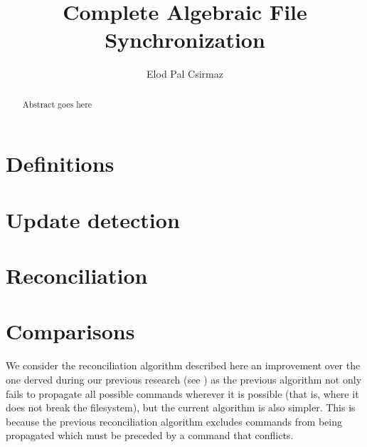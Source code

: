 \documentclass[12pt]{article}
\title{Complete Algebraic File Synchronization}
\author{Elod Pal Csirmaz}
\begin{document}
\maketitle
\begin{abstract}
Abstract goes here
\end{abstract}







\section{Definitions}\label{sec_def}











\section{Update detection}\label{sec_update}









\section{Reconciliation}\label{sec_rec}











\section{Comparisons}

We consider the reconciliation algorithm described here an improvement over
the one derved during our previous research (see \cite{NREC})
as the previous algorithm not only fails to propagate all possible commands
wherever it is possible (that is, where it does not break the filesystem),
but the current algorithm is also simpler.
This is because the previous reconciliation algorithm excludes
commands from being propagated which must be preceded by a command that conflicts.
\end{document}
